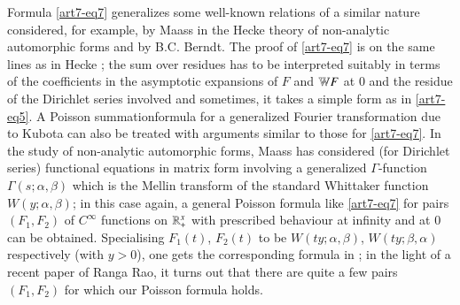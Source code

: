 Formula \eqref{art7-eq7} generalizes some well-known relations of a similar nature considered, for example, by Maass \cite{art7-M1} in the Hecke theory of non-analytic automorphic forms and by B.C. Berndt. The proof of \eqref{art7-eq7} is on the same lines as in Hecke \cite{art7-H2}; the sum over residues has to be interpreted suitably in terms of the coefficients in the asymptotic expansions of $F$ and $\mathbb{W} F$ at 0 and the residue of the Dirichlet series involved and sometimes, it takes a simple form as in \eqref{art7-eq5}. A Poisson summation\pageoriginale formula for a generalized Fourier transformation due to Kubota can also be treated with arguments similar to those for \eqref{art7-eq7}. In the study of non-analytic automorphic forms, Maass \cite{art7-M2} has considered (for Dirichlet series) functional equations in matrix form involving a generalized $\Gamma$-function $\Gamma (s; \alpha, \beta)$ which is the Mellin transform of the standard Whittaker function $W(y; \alpha, \beta)$; in this case again, a general Poisson formula like \eqref{art7-eq7} for pairs $(F_1, F_2)$ of $C^\infty$ functions on $\mathbb{R}^x_+$ with prescribed behaviour at infinity and at 0 can be obtained. Specialising $F_1 (t)$, $F_2 (t)$ to be $W (ty; \alpha, \beta)$, $W(ty; \beta, \alpha)$ respectively (with $y > 0$), one gets the corresponding formula in \cite{art7-M2}; in the light of a recent paper of Ranga Rao, it turns out that there are quite a few pairs $(F_1, F_2)$ for which our Poisson formula holds.

